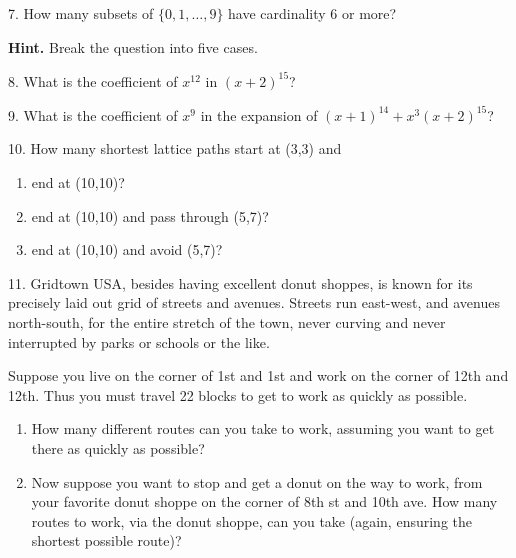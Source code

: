 \documentclass[12pt,]{book}
\theoremstyle{plain}
\theoremstyle{definition}
\theoremstyle{definition}
\theoremstyle{definition}
\numberwithin{equation}{chapter}
\begin{document}
\begin{exerciselist}
\item[7.]\hypertarget{exercise-108}{}\hypertarget{p-895}{}%
How many subsets of \(\{0,1,\ldots, 9\}\) have cardinality 6 or more?%
\par\smallskip
\par\smallskip%
\noindent\textbf{Hint.}\hypertarget{hint-6}{}\quad%
\hypertarget{p-896}{}%
Break the question into five cases.%
\item[8.]\hypertarget{exercise-109}{}\hypertarget{p-897}{}%
What is the coefficient of \(x^{12}\) in \((x+2)^{15}\)?%
\par\smallskip
\item[9.]\hypertarget{exercise-110}{}\hypertarget{p-899}{}%
What is the coefficient of \(x^9\) in the expansion of \((x+1)^{14} + x^3(x+2)^{15}\)?%
\par\smallskip
\item[10.]\hypertarget{exercise-111}{}\hypertarget{p-900}{}%
How many shortest lattice paths start at (3,3) and \leavevmode%
\begin{enumerate}[label=(\alph*)]
\item\hypertarget{li-420}{}\hypertarget{p-901}{}%
end at (10,10)?%
\item\hypertarget{li-421}{}\hypertarget{p-902}{}%
end at (10,10) and pass through (5,7)?%
\item\hypertarget{li-422}{}\hypertarget{p-903}{}%
end at (10,10) and avoid (5,7)?%
\end{enumerate}
%
\par\smallskip
\item[11.]\hypertarget{exercise-112}{}\hypertarget{p-905}{}%
Gridtown USA, besides having excellent donut shoppes, is known for its precisely laid out grid of streets and avenues. Streets run east-west, and avenues north-south, for the entire stretch of the town, never curving and never interrupted by parks or schools or the like.%
\par
\hypertarget{p-906}{}%
Suppose you live on the corner of 1st and 1st and work on the corner of 12th and 12th. Thus you must travel 22 blocks to get to work as quickly as possible. \leavevmode%
\begin{enumerate}[label=(\alph*)]
\item\hypertarget{li-426}{}\hypertarget{p-907}{}%
How many different routes can you take to work, assuming you want to get there as quickly as possible? %
\item\hypertarget{li-427}{}\hypertarget{p-908}{}%
Now suppose you want to stop and get a donut on the way to work, from your favorite donut shoppe on the corner of 8th st and 10th ave. How many routes to work, via the donut shoppe, can you take (again, ensuring the shortest possible route)? %

\end{enumerate}
\end{exerciselist}
\end{document}
